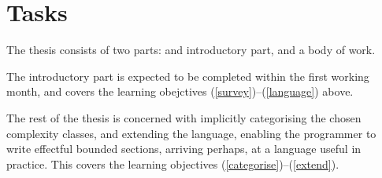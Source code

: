 
\section{Tasks}

The thesis consists of two parts: and introductory part, and a body of work.

The introductory part is expected to be completed within the first working
month, and covers the learning obejctives (\ref{survey})--(\ref{language})
above.

The rest of the thesis is concerned with implicitly categorising the chosen
complexity classes, and extending the language, enabling the programmer to
write effectful bounded sections, arriving perhaps, at a language useful in
practice. This covers the learning objectives
(\ref{categorise})--(\ref{extend}).
